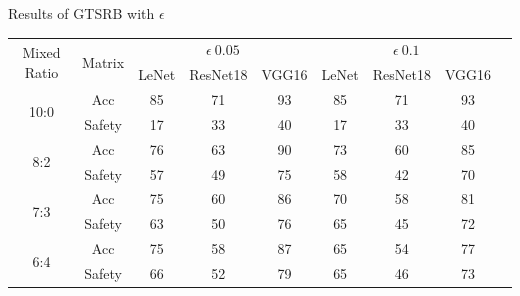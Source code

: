 \documentclass[journal,article,submit,moreauthors,pdftex]{Definitions/mdpi}
\begin{document}
\begin{specialtable}[H]
    \centering
    \caption{Results of GTSRB with \begin{math}\epsilon\end{math}}
    \label{gtsrb-results}
    {\small
    \begin{tabular}{|c|c|c|c|c|c|c|c|c|}
    \hline
    \multirow{2}{*}{Mixed Ratio} & \multirow{2}{*}{Matrix} & \multicolumn{3}{c|}{\begin{math}\epsilon \ 0.05\end{math}}  & \multicolumn{3}{c|}{\begin{math}\epsilon \ 0.1\end{math}}       \\ \cline{3-8}
                                 &                           & LeNet               & ResNet18              & VGG16       & LeNet              & ResNet18              & VGG16              \\ \hline 
    \multirow{2}{*}{10:0}        & Acc                       & 85                  & 71                    & 93          & 85                 & 71                    & 93                 \\ \cline{2-8} 
                                 & Safety                    & 17                  & 33                    & 40          & 17                 & 33                    & 40                 \\ \hline 
    \multirow{2}{*}{8:2}         & Acc                       & 76                  & 63                    & 90          & 73                 & 60                    & 85                 \\ \cline{2-8} 
                                 & Safety                    & 57                  & 49                    & 75          & 58                 & 42                    & 70                 \\ \hline 
    \multirow{2}{*}{7:3}         & Acc                       & 75                  & 60                    & 86          & 70                 & 58                    & 81                 \\ \cline{2-8} 
                                 & Safety                    & 63                  & 50                    & 76          & 65                 & 45                    & 72                 \\ \hline 
    \multirow{2}{*}{6:4}         & Acc                       & 75                  & 58                    & 87          & 65                 & 54                    & 77                 \\ \cline{2-8} 
                                 & Safety                    & 66                  & 52                    & 79          & 65                 & 46                    & 73                 \\ \hline 
    \end{tabular}
    }
\end{specialtable}
\end{document}
